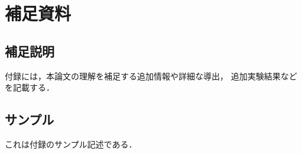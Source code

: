 
\chapter{補足資料}

\section{補足説明}

付録には，本論文の理解を補足する追加情報や詳細な導出，
追加実験結果などを記載する．

\section{サンプル}

これは付録のサンプル記述である．
